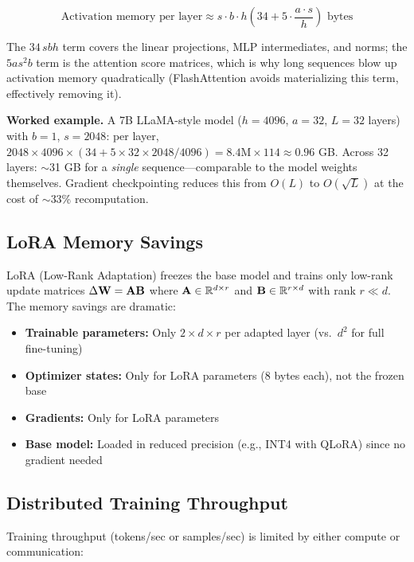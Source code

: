 \begin{equation}
\text{Activation memory per layer} \approx s \cdot b \cdot h \left(34 + 5 \cdot \frac{a \cdot s}{h}\right) \text{ bytes}
\end{equation}

The $34\,sbh$ term covers the linear projections, MLP intermediates, and norms; the $5as^2b$ term is the attention score matrices, which is why long sequences blow up activation memory quadratically (FlashAttention avoids materializing this term, effectively removing it).

\textbf{Worked example.} A 7B LLaMA-style model ($h = 4096$, $a = 32$, $L = 32$ layers) with $b = 1$, $s = 2048$: per layer, $2048 \times 4096 \times (34 + 5 \times 32 \times 2048 / 4096) = 8.4\text{M} \times 114 \approx 0.96$ GB. Across 32 layers: $\sim$31 GB for a \textit{single} sequence---comparable to the model weights themselves. Gradient checkpointing reduces this from $O(L)$ to $O(\sqrt{L})$ at the cost of $\sim$33\% recomputation.

\subsection{LoRA Memory Savings}

LoRA (Low-Rank Adaptation) freezes the base model and trains only low-rank update matrices $\Delta \mathbf{W} = \mathbf{A}\mathbf{B}$ where $\mathbf{A} \in \mathbb{R}^{d \times r}$ and $\mathbf{B} \in \mathbb{R}^{r \times d}$ with rank $r \ll d$. The memory savings are dramatic:

\begin{itemize}
    \item \textbf{Trainable parameters:} Only $2 \times d \times r$ per adapted layer (vs.\ $d^2$ for full fine-tuning)
    \item \textbf{Optimizer states:} Only for LoRA parameters (8 bytes each), not the frozen base
    \item \textbf{Gradients:} Only for LoRA parameters
    \item \textbf{Base model:} Loaded in reduced precision (e.g., INT4 with QLoRA) since no gradient needed
\end{itemize}

\subsection{Distributed Training Throughput}

Training throughput (tokens/sec or samples/sec) is limited by either compute or communication:

